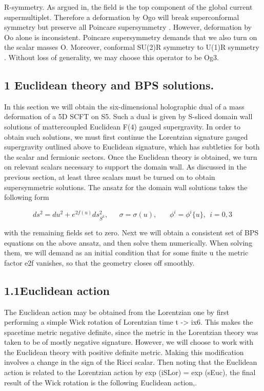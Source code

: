 \documentclass{article}
\begin{document}
\sloppy

R-symmetry. As argued in, the field  is the top component of the global current
supermultiplet. Therefore a deformation by Ogo will break superconformal symmetry but
preserve all Poincare supersymmetry . However, deformation by Oo alone is inconsistent.
Poincare supersymmetry demands that we also turn on the scalar masses O. Moreover,
conformal SU(2)R symmetry to U(1)R symmetry . Without loss of generality, we may choose
this operator to be Og3.


\subsection*{1 Euclidean theory and BPS solutions.}


In this section we will obtain the six-dimensional holographic dual of a mass deformation
of a 5D SCFT on S5. Such a dual is given by S-sliced domain wall solutions of mattercoupled Euclidean F(4) gauged supergravity. In order to obtain such solutions, we must first
continue the Lorentzian signature gauged supergravity outlined above to Euclidean signature,
which has subtleties for both the scalar and fermionic sectors. Once the Euclidean theory
is obtained, we turn on relevant scalars necessary to support the domain wall. As discussed
in the previous section, at least three scalars must be turned on to obtain supersymmetric
solutions. The ansatz for the domain wall solutions takes the following form


\begin{equation}
d s ^ { 2 } = d u ^ { 2 } + e ^ { 2 f ( u ) } d s _ { S ^ { k } } ^ { 2 }, ~ ~ ~ ~ ~ ~ ~ \sigma = \sigma ( u ), ~ ~ ~ ~ ~ ~ ~ ~ \phi ^ { i } = \phi ^ { i } \{ u \}, ~ ~ i = 0, 3 ~
\end{equation}


with the remaining fields set to zero. Next we will obtain a consistent set of BPS equations
on the above ansatz, and then solve them numerically. When solving them, we will demand
as an initial condition that for some finite u the metric factor e2f vanishes, so that the
geometry closes off smoothly.


\subsection*{1.1Euclidean action}


The Euclidean action may be obtained from the Lorentzian one by first performing a simple
Wick rotation of Lorentzian time t -> ix6. This makes the spacetime metric negative definite, since the metric in the Lorentzian theory was taken to be of mostly negative signature.
However, we will choose to work with the Euclidean theory with positive definite metric.
Making this modification involves a change in the sign of the Ricci scalar. Then noting that
the Euclidean action is related to the Lorentzian action by exp (iSLor) = exp (sEuc), the
final result of the Wick rotation is the following Euclidean action,.
\end{document}
